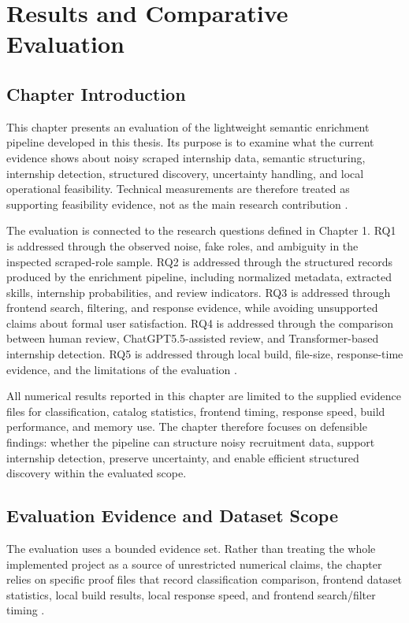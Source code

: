 \chapter{Results and Comparative Evaluation}

\section{Chapter Introduction}

This chapter presents an evaluation of the lightweight semantic enrichment pipeline developed in this thesis. Its purpose is to examine what the current evidence shows about noisy scraped internship data, semantic structuring, internship detection, structured discovery, uncertainty handling, and local operational feasibility. Technical measurements are therefore treated as supporting feasibility evidence, not as the main research contribution \cite{wohlin2012experimentation, peffers2007design, jain1991art}.

The evaluation is connected to the research questions defined in Chapter 1. RQ1 is addressed through the observed noise, fake roles, and ambiguity in the inspected scraped-role sample. RQ2 is addressed through the structured records produced by the enrichment pipeline, including normalized metadata, extracted skills, internship probabilities, and review indicators. RQ3 is addressed through frontend search, filtering, and response evidence, while avoiding unsupported claims about formal user satisfaction. RQ4 is addressed through the comparison between human review, ChatGPT5.5-assisted review, and Transformer-based internship detection. RQ5 is addressed through local build, file-size, response-time evidence, and the limitations of the evaluation \cite{wohlin2012experimentation}.

All numerical results reported in this chapter are limited to the supplied evidence files for classification, catalog statistics, frontend timing, response speed, build performance, and memory use. The chapter therefore focuses on defensible findings: whether the pipeline can structure noisy recruitment data, support internship detection, preserve uncertainty, and enable efficient structured discovery within the evaluated scope.

\section{Evaluation Evidence and Dataset Scope}

The evaluation uses a bounded evidence set. Rather than treating the whole implemented project as a
source of unrestricted numerical claims, the chapter relies on specific proof files that record classification
comparison, frontend dataset statistics, local build results, local response speed, and frontend search/filter
timing \cite{wohlin2012experimentation, jain1991art}.

